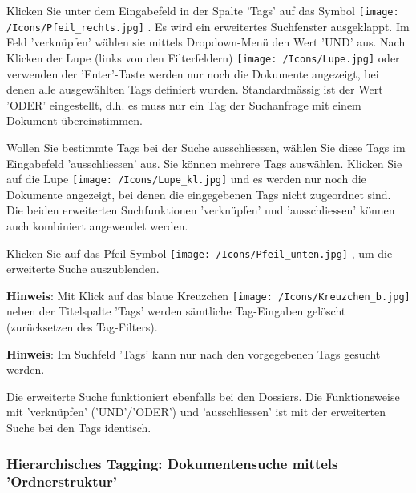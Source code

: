 Klicken Sie unter dem Eingabefeld in der Spalte 'Tags' auf das Symbol \texttt{[image: /Icons/Pfeil\_rechts.jpg]} . Es wird ein erweitertes Suchfenster ausgeklappt. Im Feld 'verknüpfen'  wählen sie mittels Dropdown-Menü den Wert 'UND'  aus. Nach Klicken der Lupe (links von den Filterfeldern) \texttt{[image: /Icons/Lupe.jpg]}  oder verwenden der 'Enter'-Taste werden nur noch die Dokumente angezeigt, bei denen alle ausgewählten Tags definiert wurden. Standardmässig ist der Wert 'ODER' eingestellt, d.h. es muss nur ein Tag der Suchanfrage mit einem Dokument übereinstimmen. \newline

Wollen Sie bestimmte Tags bei der Suche ausschliessen, wählen Sie diese Tags im Eingabefeld 'ausschliessen'  aus. Sie können mehrere Tags auswählen. Klicken Sie auf die Lupe \texttt{[image: /Icons/Lupe\_kl.jpg]} und es werden nur noch die Dokumente angezeigt, bei denen die eingegebenen Tags nicht zugeordnet sind. Die beiden erweiterten Suchfunktionen 'verknüpfen' und 'ausschliessen' können auch kombiniert angewendet werden.

\vspace{\baselineskip}

Klicken Sie auf das Pfeil-Symbol \texttt{[image: /Icons/Pfeil\_unten.jpg]} , um die erweiterte Suche auszublenden.

\vspace{\baselineskip}

\textbf{Hinweis}: Mit Klick auf das blaue Kreuzchen \texttt{[image: /Icons/Kreuzchen\_b.jpg]} neben der Titelspalte 'Tags' werden sämtliche Tag-Eingaben gelöscht (zurücksetzen des Tag-Filters).

\vspace{\baselineskip}

\textbf{Hinweis}: Im Suchfeld 'Tags' kann nur nach den vorgegebenen Tags gesucht werden. 

\vspace{\baselineskip}

Die erweiterte Suche funktioniert ebenfalls bei den Dossiers. Die Funktionsweise mit 'verknüpfen' ('UND'/'ODER') und 'ausschliessen' ist mit der erweiterten Suche bei den Tags identisch.

\subsubsection{Hierarchisches Tagging: Dokumentensuche mittels 'Ordnerstruktur'}
\label{bkm:Ref201801849}

